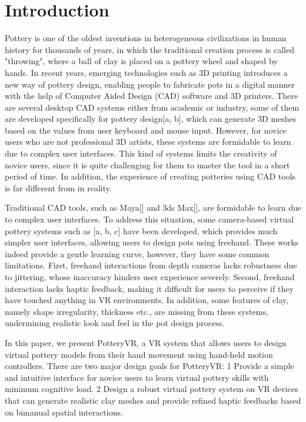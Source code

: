 \section{Introduction}
\label{sec:1}
Pottery is one of the oldest inventions in heterogeneous civilizations in human history for thousands of years, in which the traditional creation process is called "throwing", where a ball of clay is placed on a pottery wheel and shaped by hands. 
In recent years, emerging technologies such as 3D printing introduces a new way of pottery design, enabling people to fabricate pots in a digital manner with the help of Computer Aided Design (CAD) software and 3D printers.
There are several desktop CAD systems either from academic or industry, some of them are developed specifically for pottery design[a, b], which can generate 3D meshes based on the values from user keyboard and mouse input.
However, for novice users who are not professional 3D artists, these systems are formidable to learn due to complex user interfaces. 
This kind of systems limits the creativity of novice users, since it is quite challenging for them to master the tool in a short period of time.
In addition, the experience of creating potteries using CAD tools is far different from in reality.

Traditional CAD tools, such as Maya[] and 3ds Max[], are formidable to learn due to complex user interfaces.
To address this situation, some camera-based virtual pottery systems such as [a, b, c] have been developed, which provides much simpler user interfaces, allowing users to design pots using freehand.
These works indeed provide a gentle learning curve, however, they have some common limitations.
First, freehand interactions from depth cameras lacks robustness due to jittering, whose inaccuracy hinders user experience severely.
Second, freehand interaction lacks haptic feedback, making it difficult for users to perceive if they have touched anything in VR environments.
In addition, some features of clay, namely shape irregularity, thickness etc., are missing from these systems, undermining realistic look and feel in the pot design process.

In this paper, we present PotteryVR, a VR system that allows users to design virtual pottery models from their hand movement using hand-held motion controllers. There are two major design goals for PotteryVR:
1 Provide a simple and intuitive interface for novice users to learn virtual pottery skills with minimum cognitive load.
2 Design a robust virtual pottery system on VR devices that can generate realistic clay meshes and provide refined haptic feedbacks based on bimanual spatial interactions.

